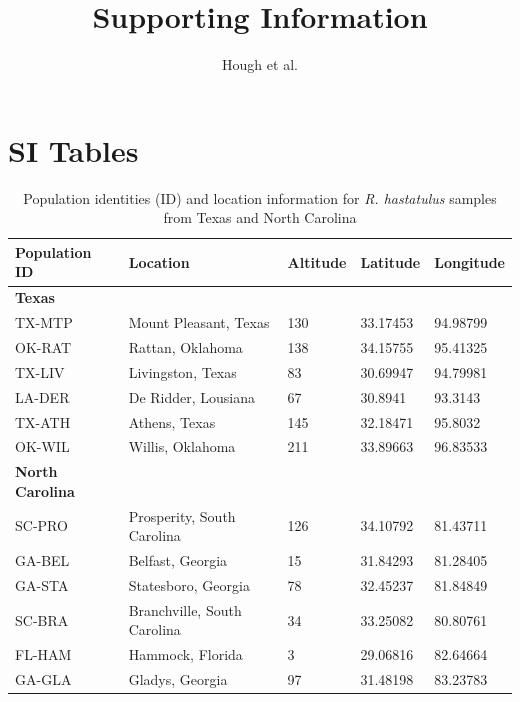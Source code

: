 \documentclass[9pt,onecolumn,twoside]{pnas-new}
\title{Supporting Information}
\author{Hough et al.}
\begin{document}
\maketitle



\section*{SI Tables}

\begin{table}[tbhp!]
\centering
\caption{Population identities (ID) and location information for \textit{R. hastatulus} samples from Texas and North Carolina}
\begin{tabular}{lllll}
Population ID & Location & Altitude & Latitude & Longitude \\
\midrule
\textbf{Texas} &  &  &  &  \\
TX-MTP & Mount Pleasant, Texas & 130	 & 33.17453 & 94.98799 \\
OK-RAT & Rattan, Oklahoma & 138 & 34.15755 & 95.41325 \\
TX-LIV & Livingston, Texas & 83 & 30.69947 & 94.79981 \\
LA-DER & De Ridder, Lousiana & 67 & 30.8941 & 93.3143 \\
TX-ATH & Athens, Texas & 145 & 32.18471 & 95.8032 \\
OK-WIL & Willis, Oklahoma & 211 & 33.89663 & 96.83533 \\
\textbf{North Carolina} &  &  &  &  \\
SC-PRO & Prosperity, South Carolina & 126 & 34.10792 & 81.43711 \\
GA-BEL & Belfast, Georgia & 15 & 31.84293 & 81.28405 \\
GA-STA & Statesboro, Georgia & 78 & 32.45237 & 81.84849 \\
SC-BRA & Branchville, South Carolina & 	34 & 33.25082 & 80.80761 \\
FL-HAM & Hammock, Florida & 3 & 29.06816 & 82.64664 \\
GA-GLA & Gladys, Georgia	 & 97 & 31.48198 & 83.23783 \\
\bottomrule
\end{tabular}
\end{table}
\end{document}

